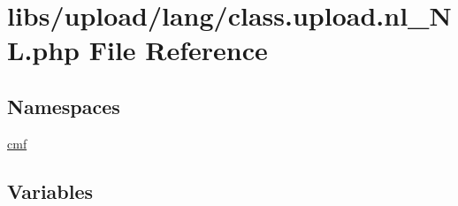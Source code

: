 \hypertarget{class_8upload_8nl___n_l_8php}{}\section{libs/upload/lang/class.upload.\+nl\+\_\+\+N\+L.\+php File Reference}
\label{class_8upload_8nl___n_l_8php}
\subsection*{Namespaces}
\begin{DoxyCompactItemize}
\item 
 \hyperlink{namespacecmf}{cmf}
\end{DoxyCompactItemize}
\subsection*{Variables}
